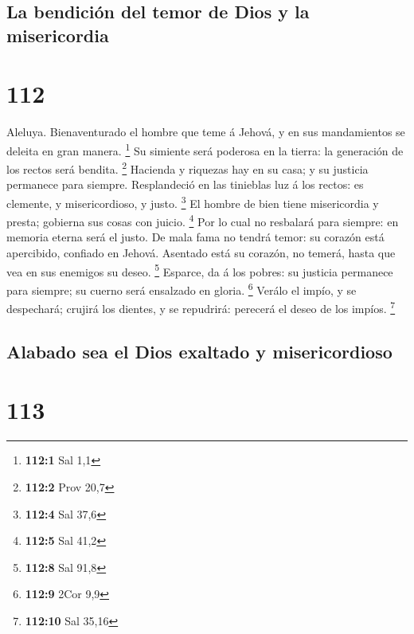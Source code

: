 \hypertarget{la-bendiciuxf3n-del-temor-de-dios-y-la-misericordia}{%
\subsection{La bendición del temor de Dios y la
misericordia}\label{la-bendiciuxf3n-del-temor-de-dios-y-la-misericordia}}

\hypertarget{section-111}{%
\section{112}\label{section-111}}

 Aleluya. Bienaventurado el hombre que teme á Jehová, y en
sus mandamientos se deleita en gran manera. \footnote{\textbf{112:1} Sal
  1,1}  Su simiente será poderosa en la tierra: la
generación de los rectos será bendita. \footnote{\textbf{112:2} Prov
  20,7}  Hacienda y riquezas hay en su casa; y su justicia
permanece para siempre.  Resplandeció en las tinieblas luz á
los rectos: es clemente, y misericordioso, y justo. \footnote{\textbf{112:4}
  Sal 37,6}  El hombre de bien tiene misericordia y presta;
gobierna sus cosas con juicio. \footnote{\textbf{112:5} Sal 41,2}
 Por lo cual no resbalará para siempre: en memoria eterna
será el justo.  De mala fama no tendrá temor: su corazón
está apercibido, confiado en Jehová.  Asentado está su
corazón, no temerá, hasta que vea en sus enemigos su deseo. \footnote{\textbf{112:8}
  Sal 91,8}  Esparce, da á los pobres: su justicia permanece
para siempre; su cuerno será ensalzado en gloria. \footnote{\textbf{112:9}
  2Cor 9,9}  Verálo el impío, y se despechará; crujirá los
dientes, y se repudrirá: perecerá el deseo de los impíos. \footnote{\textbf{112:10}
  Sal 35,16}

\hypertarget{alabado-sea-el-dios-exaltado-y-misericordioso}{%
\subsection{Alabado sea el Dios exaltado y
misericordioso}\label{alabado-sea-el-dios-exaltado-y-misericordioso}}

\hypertarget{section-112}{%
\section{113}\label{section-112}}

